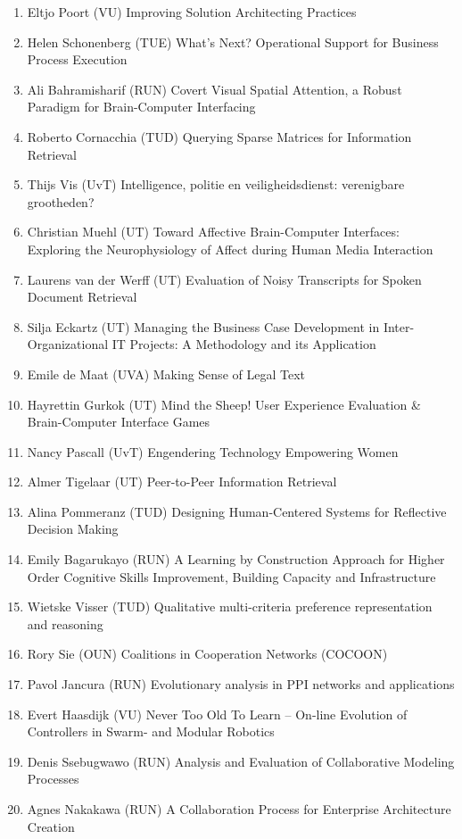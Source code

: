 \begin{multicols}{2}
\begin{scriptsize}
\begin{enumerate}[leftmargin=*,noitemsep,topsep=0pt,parsep=1pt,partopsep=0pt]
\item Eltjo Poort (VU) Improving Solution Architecting Practices
\item Helen Schonenberg (TUE) What's Next? Operational Support for Business Process Execution
\item Ali Bahramisharif (RUN) Covert Visual Spatial Attention, a Robust Paradigm for Brain-Computer Interfacing
\item Roberto Cornacchia (TUD) Querying Sparse Matrices for Information Retrieval
\item Thijs Vis (UvT) Intelligence, politie en veiligheidsdienst: verenigbare grootheden? 
\item Christian Muehl (UT) Toward Affective Brain-Computer Interfaces: Exploring the Neurophysiology of Affect during Human Media Interaction
\item Laurens van der Werff (UT) Evaluation of Noisy Transcripts for Spoken Document Retrieval
\item Silja Eckartz (UT) Managing the Business Case Development in Inter-Organizational IT Projects: A Methodology and its Application 
\item Emile de Maat (UVA) Making Sense of Legal Text 
\item Hayrettin Gurkok (UT) Mind the Sheep! User Experience Evaluation \& Brain-Computer Interface Games
\item Nancy Pascall (UvT) Engendering Technology Empowering Women 
\item Almer Tigelaar (UT) Peer-to-Peer Information Retrieval
\item Alina Pommeranz (TUD) Designing Human-Centered Systems for Reflective Decision Making
\item Emily Bagarukayo (RUN) A Learning by Construction Approach for Higher Order Cognitive Skills Improvement, Building Capacity and Infrastructure
\item Wietske Visser (TUD) Qualitative multi-criteria preference representation and reasoning 
\item Rory Sie (OUN) Coalitions in Cooperation Networks (COCOON)
\item Pavol Jancura (RUN) Evolutionary analysis in PPI networks and applications 
\item Evert Haasdijk (VU) Never Too Old To Learn -- On-line Evolution of Controllers in Swarm- and Modular Robotics
\item Denis Ssebugwawo (RUN) Analysis and Evaluation of Collaborative Modeling Processes
\item Agnes Nakakawa (RUN) A Collaboration Process for Enterprise Architecture Creation

\end{enumerate}
\end{scriptsize}
\end{multicols}
